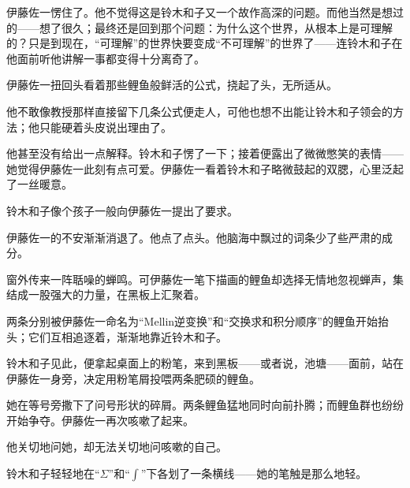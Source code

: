 
伊藤佐一愣住了。他不觉得这是铃木和子又一个故作高深的问题。而他当然是想过的——想了很久；最终还是回到那个问题：为什么这个世界，从根本上是可理解的？只是到现在，“可理解”的世界快要变成“不可理解”的世界了——连铃木和子在他面前听他讲解一事都变得十分离奇了。

伊藤佐一扭回头看着那些鲤鱼般鲜活的公式，挠起了头，无所适从。

他不敢像教授那样直接留下几条公式便走人，可他也想不出能让铃木和子领会的方法；他只能硬着头皮说出理由了。

他甚至没有给出一点解释。铃木和子愣了一下；接着便露出了微微憋笑的表情——她觉得伊藤佐一此刻有点可爱。伊藤佐一看着铃木和子略微鼓起的双腮，心里泛起了一丝暖意。

铃木和子像个孩子一般向伊藤佐一提出了要求。

伊藤佐一的不安渐渐消退了。他点了点头。他脑海中飘过的词条少了些严肃的成分。


窗外传来一阵聒噪的蝉鸣。可伊藤佐一笔下描画的鲤鱼却选择无情地忽视蝉声，集结成一股强大的力量，在黑板上汇聚着。

两条分别被伊藤佐一命名为“Mellin逆变换”和“交换求和积分顺序”的鲤鱼开始抬头；它们互相追逐着，渐渐地靠近铃木和子。



铃木和子见此，便拿起桌面上的粉笔，来到黑板——或者说，池塘——面前，站在伊藤佐一身旁，决定用粉笔屑投喂两条肥硕的鲤鱼。


她在等号旁撒下了问号形状的碎屑。两条鲤鱼猛地同时向前扑腾；而鲤鱼群也纷纷开始争夺。伊藤佐一再次咳嗽了起来。

他关切地问她，却无法关切地问咳嗽的自己。

铃木和子轻轻地在“\(\Sigma\)”和“\(\int\)”下各划了一条横线——她的笔触是那么地轻。


